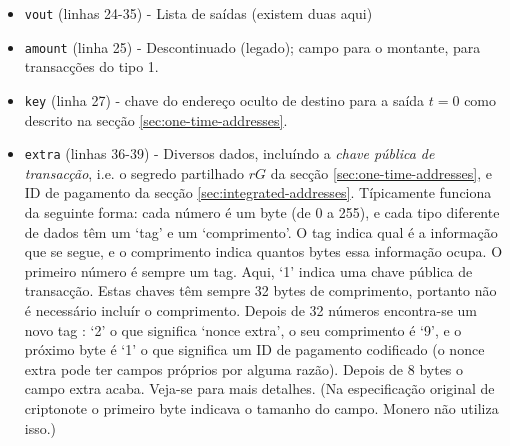 \begin{itemize}
	\item {\tt vout} (linhas 24-35) - Lista de saídas (existem duas aqui)
	\item {\tt amount} (linha 25) - Descontinuado (legado); campo para o montante, para transacções do tipo 1.
	\item {\tt key} (linha 27) - chave do endereço oculto de destino para a saída $t = 0$ como descrito na secção \ref{sec:one-time-addresses}.
	\item {\tt extra} (linhas 36-39) - Diversos dados,  incluíndo a {\em chave pública de transacção}, i.e. o segredo partilhado $r G$ da secção \ref{sec:one-time-addresses}, e ID de pagamento da secção \ref{sec:integrated-addresses}. Típicamente funciona da seguinte forma: cada número é um byte (de 0 a 255), e cada tipo diferente de dados têm um `tag' e um `comprimento'. O tag indica qual é a informação que se segue, e o comprimento indica quantos bytes essa informação ocupa. O primeiro número é sempre um tag. Aqui, `1' indica uma chave pública de transacção. Estas chaves têm sempre 32 bytes de comprimento, portanto não é necessário incluír o comprimento. Depois de 32 números encontra-se um novo tag : `2' o que significa `nonce extra', o seu comprimento é `9', e o próximo byte é `1' o que significa um ID de pagamento codificado (o nonce extra pode ter campos próprios por alguma razão). Depois de 8 bytes o campo extra acaba. Veja-se \cite{extra-field-stackexchange} para mais detalhes. (Na especificação original de criptonote o primeiro byte indicava o tamanho do campo. Monero não utiliza isso.) \cite{tx-extra-field}  

\end{itemize}
